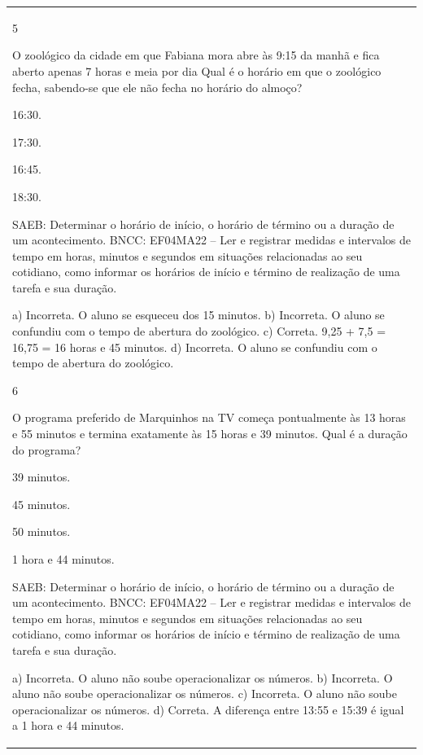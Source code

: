 \begin{mdframed}[linewidth=2pt,linecolor=salmao,roundcorner=2pt]
\begin{escolha}
{{{\begin{longtable}[]{@{}l@{}}
\begin{itemize}
{\num{5}

O zoológico da cidade em que Fabiana mora abre às 9:15 da manhã e fica
aberto apenas 7 horas e meia por dia Qual é o horário em que o zoológico
fecha, sabendo-se que ele não fecha no horário do almoço?

\begin{escolha}
\item
  16:30.
\item
  17:30.
\item
  16:45.
\item
  18:30.
\end{escolha}

SAEB: Determinar o horário de início, o horário de término ou
a duração de um acontecimento.
BNCC: EF04MA22 -- Ler e registrar medidas e intervalos de tempo em horas, minutos e segundos em
situações relacionadas ao seu cotidiano, como informar os horários de início e término de realização
de uma tarefa e sua duração.

a) Incorreta. O aluno se esqueceu dos 15 minutos.
b) Incorreta. O aluno se confundiu com o tempo de abertura do zoológico.
c) Correta. 9,25 + 7,5 = 16,75 = 16 horas e 45 minutos.
d) Incorreta. O aluno se confundiu com o tempo de abertura do zoológico.

\num{6}

O programa preferido de Marquinhos na TV começa pontualmente às 13
horas e 55 minutos e termina exatamente às 15 horas e 39 minutos. Qual é a
duração do programa?

\begin{escolha}
\item
  39 minutos.
\item
  45 minutos.
\item
  50 minutos.
\item
  1 hora e 44 minutos.
\end{escolha}

SAEB: Determinar o horário de início, o horário de término ou
a duração de um acontecimento.
BNCC: EF04MA22 -- Ler e registrar medidas e intervalos de tempo em horas, minutos e segundos em
situações relacionadas ao seu cotidiano, como informar os horários de início e término de realização
de uma tarefa e sua duração.

a) Incorreta. O aluno não soube operacionalizar os números.
b) Incorreta. O aluno não soube operacionalizar os números.
c) Incorreta. O aluno não soube operacionalizar os números.
d) Correta. A diferença entre 13:55 e 15:39 é igual a 1 hora e 44 minutos.

}
\end{itemize}
\end{longtable}}}}
\end{escolha}
\end{mdframed}
